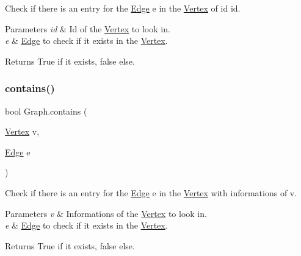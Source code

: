 Check if there is an entry for the \hyperlink{classEdge}{Edge} e in the \hyperlink{structVertex}{Vertex} of id \textquotesingle{}id\textquotesingle{}. 


\begin{DoxyParams}{Parameters}
{\em id} & Id of the \hyperlink{structVertex}{Vertex} to look in.\\
\hline
{\em e} & \hyperlink{classEdge}{Edge} to check if it exists in the \hyperlink{structVertex}{Vertex}.\\
\hline
\end{DoxyParams}
\begin{DoxyReturn}{Returns}
True if it exists, false else.
\end{DoxyReturn}
\mbox{\label{classGraph_a180cb9caf5f5783cd92e8be2fff51fab}} 
\subsubsection{\texorpdfstring{contains()}{contains()}\hspace{0.1cm}{\footnotesize\ttfamily [5/5]}}
{\footnotesize\ttfamily bool Graph.\+contains (\begin{DoxyParamCaption}\item[{\hyperlink{structVertex}{Vertex}}]{v,  }\item[{\hyperlink{classEdge}{Edge}}]{e }\end{DoxyParamCaption})\hspace{0.3cm}{\ttfamily [inline]}}



Check if there is an entry for the \hyperlink{classEdge}{Edge} e in the \hyperlink{structVertex}{Vertex} with informations of v. 


\begin{DoxyParams}{Parameters}
{\em v} & Informations of the \hyperlink{structVertex}{Vertex} to look in.\\
\hline
{\em e} & \hyperlink{classEdge}{Edge} to check if it exists in the \hyperlink{structVertex}{Vertex}.\\
\hline
\end{DoxyParams}
\begin{DoxyReturn}{Returns}
True if it exists, false else.
\end{DoxyReturn}
\mbox{\label{classGraph_a9f4f47ae9bd4e6f575c494a168e204a9}} 
